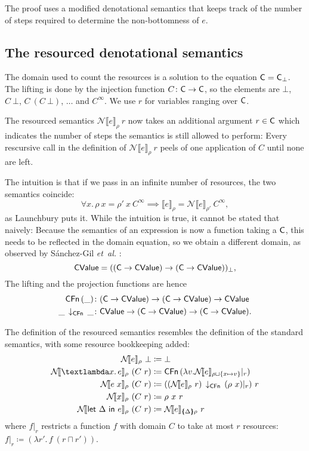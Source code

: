 \documentclass{jfp1}
\theoremstyle{nonumberbreak}
\newcommand{\sCValue}{\text{\textsf{CValue}}}
\newcommand{\sC}     {\text{\textsf{C}}}
\newcommand{\sCFn}[1]{\text{\textsf{CFn}}\,(#1)}
\newcommand{\sCFnProj}[2]{#1\,\downarrow_{\text{\textsf{CFn}}}\,#2}
\newcommand{\keyword}[1]{\text{\textsf{#1}}}
\newcommand{\sApp}[2]{#1\;#2}
\newcommand{\sLam}[2]{\text{\textlambda} #1.\, #2}
\newcommand{\sLet}[2]{\keyword{let}~#1~\keyword{in}~#2}
\newcommand{\dsem}[2]{\llbracket #1 \rrbracket_{#2}}
\newcommand{\esem}[1]{\{\!\!\!\{#1\}\!\!\!\}}
\newcommand{\dsemr}[2]{\mathcal N\!\llbracket #1 \rrbracket_{#2}}
\newcommand{\Crestr}[2]{ #1 |_{#2}}
\begin{document}
The proof uses a modified denotational semantics that keeps track of the number of steps required to determine the non-bottomness of $e$.

\subsection{The resourced denotational semantics}

The domain used to count the resources is a solution to the equation $\sC = \sC_\bot$. The lifting is done by the injection function $C \colon \sC \to \sC$, so the elements are $\bot$, $C~\bot$, $C~(C~\bot)$, $\ldots$ and $C^\infty$. We use $r$ for variables ranging over $\sC$.

The resourced semantics $\dsemr{e}{\rho}~r$ now takes an additional argument $r \in \sC$ which indicates the number of steps the semantics is still allowed to perform: Every rescursive call in the definition of $\dsemr{e}{\rho}~r$ peels of one application of $C$ until none are left.

The intuition is that if we pass in an infinite number of resources, the two semantics coincide: \[
\forall x.\, \rho~x = \rho'~x~C^\infty \implies \dsem{e}{\rho} = \dsemr{e}{\rho'}~C^\infty,
\]
as Launchbury puts it. While the intuition is true, it cannot be stated that naively: Because the semantics of an expression is now a function taking a $\sC$, this needs to be reflected in the domain equation, so we obtain a different domain, as observed by S{\'a}nchez-Gil {\em et~al.} :
\[
\sCValue = ((\sC \to \sCValue) \to (\sC \to \sCValue))_\bot,
\]
The lifting and the projection functions are hence
\begin{align*}
\sCFn \_ &\colon (\sC \to \sCValue) \to (\sC \to \sCValue) \to \sCValue \\
\sCFnProj{\_}{\_} &\colon \sCValue \to (\sC\to\sCValue) \to (\sC \to \sCValue).
\end{align*}



The definition of the resourced semantics resembles the definition of the standard semantics, with some resource bookkeeping added:
\begin{align*}
\dsemr{e}\rho~ \bot &\coloneqq \bot\\
\dsemr{\sLam x e}\rho ~ (C~r) &\coloneqq \sCFn{\lambda v. \Crestr{\dsemr e {\rho \sqcup \{x \mapsto v\}}} r}\\
\dsemr{\sApp e  x}\rho ~ (C~r) &\coloneqq (\sCFnProj {(\dsemr e \rho~r)}{\Crestr{(\rho~x)} r})~r\\
\dsemr{x}\rho ~ (C~r) &\coloneqq \rho~x~r\\
\dsemr{\sLet{\Delta}e}\rho ~ (C~r) &\coloneqq \dsemr e {\esem{\Delta}\rho}~r
\end{align*}
where $\Crestr{f}{r}$ restricts a function $f$ with domain $C$ to take at most $r$ resources: $\Crestr f r \coloneqq (\lambda r'.\, f ~(r \sqcap r'))$.
\end{document}
